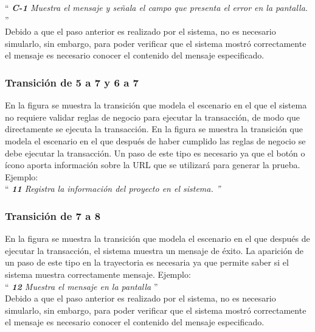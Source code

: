 		``{\it
		     {\bf C-1} \UCsist Muestra el mensaje  y señala el campo que presenta el error en la pantalla. 
		}''\\
	
			Debido a que el paso anterior es realizado por el sistema, no es necesario simularlo, sin embargo, para poder verificar que el sistema mostró correctamente el mensaje es necesario conocer el contenido del mensaje especificado.
			

\subsubsection{Transición de 5 a 7 y 6 a 7} 
En la figura  se muestra la transición que modela el escenario en el que el sistema no requiere validar reglas de negocio para ejecutar la transacción, de modo que directamente se ejecuta la transacción.
En la figura  se muestra la transición que modela el escenario en el que después de haber cumplido las reglas de negocio se debe ejecutar la transacción.
Un paso de este tipo es necesario ya que el botón o ícono aporta información sobre la URL que se utilizará para generar la prueba. Ejemplo:\\

{``\it
    {\bf 11} \UCsist Registra la información del proyecto en el sistema.
''}\\
 

 \subsubsection{Transición de 7 a 8}
  
 En la figura  se muestra la transición que modela el escenario en el que después de ejecutar la transacción, el sistema muestra un mensaje de éxito. 
 La aparición de un paso de este tipo en la trayectoria es necesaria ya que  permite saber si el sistema muestra correctamente mensaje. Ejemplo:\\

 ``{\it
     {\bf 12} \UCsist Muestra el mensaje  en la pantalla 
 }''\\
	
 	Debido a que el paso anterior es realizado por el sistema, no es necesario simularlo, sin embargo, para poder verificar que el sistema mostró correctamente el mensaje es necesario conocer el contenido del mensaje especificado.
	